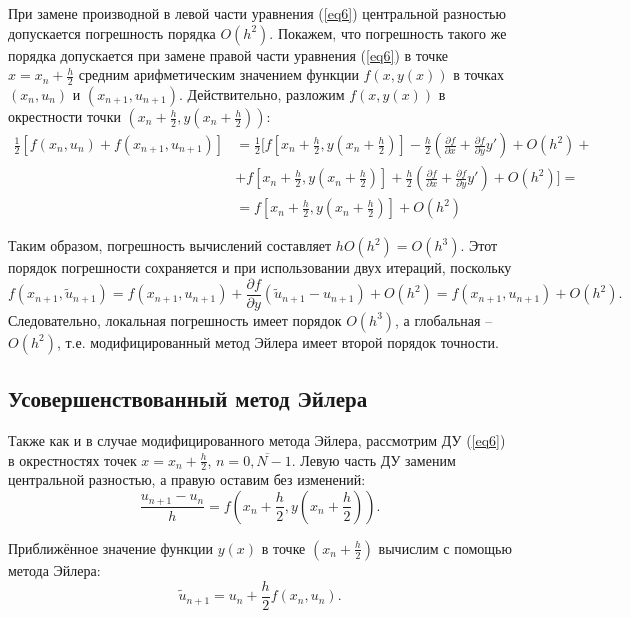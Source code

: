 \documentclass[
11pt,
master, %
subf, %
href, %
colorlinks=true, %
times, %
]{disser}
\begin{document}
При замене производной в левой части уравнения (\ref{eq6}) центральной разностью допускается погрешность порядка $O(h^2)$. Покажем, что погрешность такого же порядка допускается при замене правой части уравнения (\ref{eq6}) в точке $x = x_n + \frac{h}{2}$ средним арифметическим значением функции $f(x,y(x))$ в точках $(x_n, u_n)$ и $(x_{n+1}, u_{n+1})$. Действительно, разложим $f(x, y(x))$ в окрестности точки $\left(x_n + \frac{h}{2}, y\left(x_n + \frac{h}{2}\right)\right)$:
\begin{align*}
	\frac{1}{2}[f(x_n, u_n) + f(x_{n+1}, u_{n+1})] &= \frac{1}{2}\big[f\left[x_n + \frac{h}{2}, y\left(x_n + \frac{h}{2}\right)\right] - \frac{h}{2}\left(\frac{\partial f}{\partial x} + \frac{\partial f}{\partial y}y'\right) + O(h^2) +\\
	& + f\left[x_n + \frac{h}{2}, y\left(x_n + \frac{h}{2}\right)\right] + \frac{h}{2}\left(\frac{\partial f}{\partial x} + \frac{\partial f}{\partial y}y'\right) + O(h^2)\big] = \\
	& = f\left[x_n + \frac{h}{2}, y\left(x_n + \frac{h}{2}\right)\right] + O(h^2)
\end{align*}

Таким образом, погрешность вычислений составляет $hO(h^2) = O(h^3)$. Этот порядок погрешности сохраняется и при использовании двух итераций, поскольку
$$f(x_{n+1}, \tilde{u}_{n+1}) = f(x_{n+1}, u_{n+1}) + \frac{\partial f}{\partial y}(\tilde{u}_{n+1} - u_{n+1}) + O(h^2) = f(x_{n+1}, u_{n+1}) + O(h^2).$$
Следовательно, локальная погрешность имеет порядок $O(h^3)$, а глобальная -- $O(h^2)$, т.е. модифицированный метод Эйлера имеет второй порядок точности.

\subsection{Усовершенствованный метод Эйлера}
Также как и в случае модифицированного метода Эйлера, рассмотрим ДУ (\ref{eq6}) в окрестностях точек $x = x_n + \frac{h}{2}$, $n = \overline{0,N-1}$. Левую часть ДУ заменим центральной разностью, а правую оставим без изменений:
\begin{equation}\label{eq18}
  \frac{u_{n+1}-u_n}{h} = f\left(x_n + \frac{h}{2}, y\left(x_n + \frac{h}{2}\right)\right).
\end{equation}

Приближённое значение функции $y(x)$ в точке $\left(x_n + \frac{h}{2}\right)$ вычислим с помощью метода Эйлера:
\begin{equation}\label{eq19}
  \tilde{u}_{n+1} = u_n + \frac{h}{2} f(x_n, u_n).
\end{equation}
\end{document}
